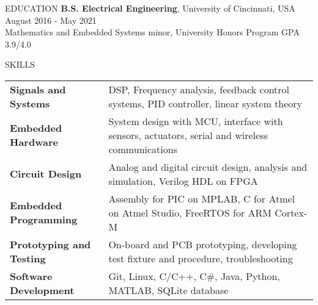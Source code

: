 \documentclass{../lib/resume} %
\begin{document}

    \begin{rSection}{EDUCATION}
        {\bf B.S. Electrical Engineering}, University of Cincinnati, USA \hfill {August 2016 - May 2021}\\
        Mathematics and Embedded Systems minor, University Honors Program \hfill {GPA 3.9/4.0}




    \end{rSection}

    \begin{rSection}{SKILLS}

        \begin{tabular}{ @{} >{\bfseries}l @{\hspace{2ex}} l }
            Signals and Systems & DSP, Frequency analysis, feedback control systems, PID controller, linear system theory	\\
            Embedded Hardware & System design with MCU, interface with sensors, actuators, serial and wireless communications \\
            Circuit Design & Analog and digital circuit design, analysis and simulation, Verilog HDL on FPGA \\
            Embedded Programming & Assembly for PIC on MPLAB, C for Atmel on Atmel Studio, FreeRTOS for ARM Cortex-M \\
            Prototyping and Testing &  On-board and PCB prototyping, developing test fixture and procedure, troubleshooting	\\
            Software Development & Git, Linux, C/C++, C\#, Java, Python, MATLAB, SQLite database \\
        \end{tabular}
    \end{rSection}
\end{document}

